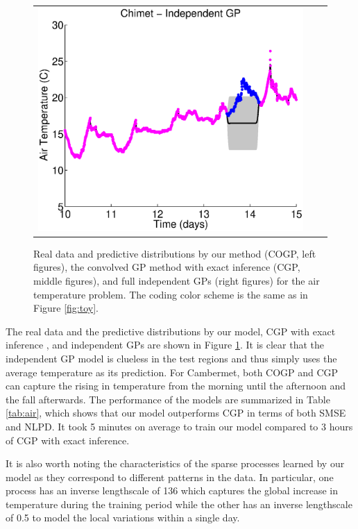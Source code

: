 \begin{figure}
\begin{tabular}{ccc}
\includegraphics[scale=0.3]{figures/weatherChimet.eps}
\end{tabular}
\caption{Real data and predictive distributions by our method (COGP, left figures), the convolved GP method with exact inference (CGP, middle figures), and full independent GPs (right figures) for the air temperature problem. The coding color scheme is the same as in Figure \ref{fig:toy}.}
\label{fig:weather}
\end{figure}

The real data and the predictive distributions by our model, CGP with exact inference \citep{alvarez-lawrence-nips-08}, and independent GPs are shown in Figure \ref{fig:weather}.
It is clear that the independent GP model is clueless in the test regions and thus simply uses the average temperature as its prediction.
For Cambermet, both COGP and CGP can capture the rising in temperature from the morning until the afternoon and the fall afterwards.
The  performance of the models are summarized in Table \ref{tab:air},  which shows that our model outperforms CGP in terms of both SMSE and NLPD.
It took 5 minutes on average to train our model compared to 3 hours of CGP with exact inference.

It is also worth noting the characteristics of the sparse processes learned by our model as they  correspond to different patterns in the data.
In particular, one process has an inverse lengthscale of 136 which captures the global increase in temperature during the training period while the other has an inverse lengthscale of 0.5 to model the local variations within a single day.


